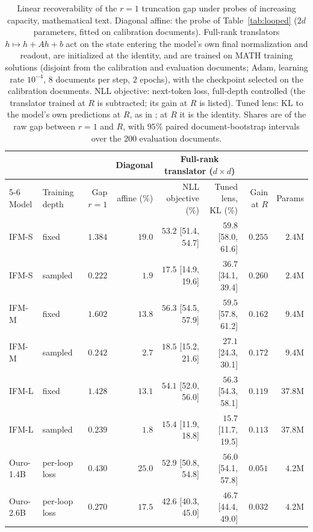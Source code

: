 \begin{table}[t]
\centering
\footnotesize\setlength{\tabcolsep}{3pt}
\begin{tabular}{llrrrrrr}
\toprule
& & & Diagonal & \multicolumn{2}{c}{Full-rank translator ($d \times d$)} & & \\
\cmidrule(lr){5-6}
Model & Training depth & Gap $r{=}1$ & affine (\%) & NLL objective (\%) & Tuned lens, KL (\%) & Gain at $R$ & Params \\
\midrule
IFM-S & fixed & $1.384$ & $19.0$ & $53.2$ {\tiny[51.4, 54.7]} & $59.8$ {\tiny[58.0, 61.6]} & $0.255$ & $2.4$M \\
IFM-S & sampled & $0.222$ & $1.9$ & $17.5$ {\tiny[14.9, 19.6]} & $36.7$ {\tiny[34.1, 39.4]} & $0.260$ & $2.4$M \\
IFM-M & fixed & $1.602$ & $13.8$ & $56.3$ {\tiny[54.5, 57.9]} & $59.5$ {\tiny[57.8, 61.2]} & $0.162$ & $9.4$M \\
IFM-M & sampled & $0.242$ & $2.7$ & $18.5$ {\tiny[15.2, 21.6]} & $27.1$ {\tiny[24.3, 30.1]} & $0.172$ & $9.4$M \\
IFM-L & fixed & $1.428$ & $13.1$ & $54.1$ {\tiny[52.0, 56.0]} & $56.3$ {\tiny[54.3, 58.1]} & $0.119$ & $37.8$M \\
IFM-L & sampled & $0.239$ & $1.8$ & $15.4$ {\tiny[11.9, 18.8]} & $15.7$ {\tiny[11.7, 19.5]} & $0.113$ & $37.8$M \\
Ouro-1.4B & per-loop loss & $0.430$ & $25.0$ & $52.9$ {\tiny[50.8, 54.8]} & $56.0$ {\tiny[54.1, 57.8]} & $0.051$ & $4.2$M \\
Ouro-2.6B & per-loop loss & $0.270$ & $17.5$ & $42.6$ {\tiny[40.3, 45.0]} & $46.7$ {\tiny[44.4, 49.0]} & $0.032$ & $4.2$M \\
\bottomrule
\end{tabular}
\caption{Linear recoverability of the $r = 1$ truncation gap under probes of increasing capacity, mathematical text. Diagonal affine: the probe of Table~\ref{tab:looped} ($2d$ parameters, fitted on calibration documents). Full-rank translators $h \mapsto h + Ah + b$ act on the state entering the model's own final normalization and readout, are initialized at the identity, and are trained on MATH training solutions (disjoint from the calibration and evaluation documents; Adam, learning rate $10^{-4}$, $8$ documents per step, $2$ epochs), with the checkpoint selected on the calibration documents. NLL objective: next-token loss, full-depth controlled (the translator trained at $R$ is subtracted; its gain at $R$ is listed). Tuned lens: KL to the model's own predictions at $R$, as in \citet{belrose2023tuned}; at $R$ it is the identity. Shares are of the raw gap between $r = 1$ and $R$, with $95\%$ paired document-bootstrap intervals over the $200$ evaluation documents.}
\label{tab:tunedlens}
\end{table}
